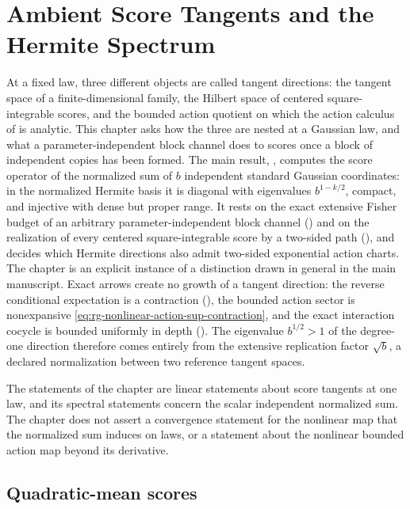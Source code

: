 \chapter{Ambient Score Tangents and the Hermite Spectrum}
\label{ch:gaussian-hermite}

At a fixed law, three different objects are called tangent directions: the
tangent space of a finite-dimensional family, the Hilbert space of centered
square-integrable scores, and the bounded action quotient on which the action
calculus of  is analytic. This chapter asks
how the three are nested at a Gaussian law, and what a parameter-independent
block channel does to scores once a block of independent copies has been formed.
The main result, , computes the score
operator of the normalized sum of \(b\) independent standard Gaussian coordinates:
in the normalized Hermite basis it is diagonal with eigenvalues \(b^{1-k/2}\),
compact, and injective with dense but proper range. It rests on the exact
extensive Fisher budget of an arbitrary parameter-independent block channel
() and on the realization of every
centered square-integrable score by a two-sided path
(), and
 decides which Hermite directions also
admit two-sided exponential action charts. The chapter is an explicit instance of
a distinction drawn in general in the main manuscript. Exact arrows create no
growth of a tangent direction: the reverse conditional expectation is a
contraction (), the bounded action sector is
nonexpansive \eqref{eq:rg-nonlinear-action-sup-contraction}, and the exact
interaction cocycle is bounded uniformly in depth
(). The eigenvalue \(b^{1/2}>1\) of
the degree-one direction therefore comes entirely from the extensive replication
factor \(\sqrt b\), a declared normalization between two reference tangent spaces.

The statements of the chapter are linear statements about score tangents at one
law, and its spectral statements concern the scalar independent normalized sum.
The chapter does not assert a convergence statement for the nonlinear map that
the normalized sum induces on laws, or a statement about the nonlinear bounded
action map beyond its derivative. 

\section{Quadratic-mean scores}
\label{sec:rg-score-lift}

